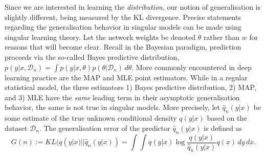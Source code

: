 \documentclass{article} %
\begin{document}
Since we are interested in learning the \textit{distribution}, our notion of generalisation is slightly different, being measured by the KL divergence.
Precise statements regarding the generalisation behavior in singular models can be made using singular learning theory.
Let the network weights be denoted $\theta$ rather than $w$ for reasons that will become clear. Recall in the Bayesian paradigm, prediction proceeds via the so-called Bayes predictive distribution,
$
p(y|x, \mathcal D_n) = \int p(y|x,\theta) p(\theta|\mathcal D_n) \,d\theta.
$
More commonly encountered in deep learning practice are the MAP and MLE point estimators.
While in a regular statistical model, the three estimators 1) Bayes predictive distribution, 2) MAP, and 3) MLE have the \textit{same} leading term in their asymptotic generalisation behavior, the same is not true in singular models.
More precisely, let $\hat q_n(y|x)$ be some estimate of the true unknown conditional density $q(y|x)$ based on the dataset $\mathcal D_n$. The generalisation error of the predictor $\hat q_n(y|x)$ is defined as
\begin{equation}
G(n) := KL (q(y|x) || \hat q_n(y|x) ) = \int \!\int q(y|x) \log \frac{q(y|x)}{\hat q_n(y|x)} q(x) \,dy  \,dx.
\label{eq:Gn}
\end{equation}
\end{document}
